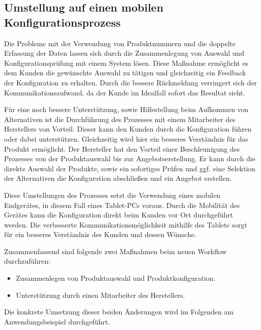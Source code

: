 \subsection{Umstellung auf einen mobilen Konfigurationsprozess}\label{mobileConfiguration}
Die Probleme mit der Verwendung von Produktnummern und die doppelte Erfassung der Daten lassen sich durch die Zusammenlegung von Auswahl und Konfigurationsprüfung mit einem System lösen. Diese Maßnahme ermöglicht es dem Kunden die gewünschte Auswahl zu tätigen und gleichzeitig ein Feedback der Konfiguration zu erhalten. Durch die bessere Rückmeldung verringert sich der Kommunikationsaufwand, da der Kunde im Idealfall sofort das Resultat sieht. \par 
 Für eine noch bessere Unterstützung, sowie Hilfestellung beim Aufkommen von Alternativen ist die Durchführung des Prozesses mit einem Mitarbeiter des Herstellers von Vorteil. Dieser kann den Kunden durch die Konfiguration führen oder dabei unterstützen. Gleichzeitig wird hier ein besseres Verständnis für das Produkt ermöglicht. Der Hersteller hat den Vorteil einer Beschleunigung des Prozesses von der Produktauswahl bis zur Angebotserstellung. Er kann durch die direkte Auswahl der Produkte, sowie ein sofortiges Prüfen und ggf. eine Selektion der Alternativen die Konfiguration abschließen und ein  Angebot erstellen. \par 
 
Diese Umstellungen des Prozesses setzt die Verwendung eines mobilen Endgerätes, in diesem Fall eines Tablet-PCs voraus. Durch die Mobilität des Gerätes kann die Konfiguration direkt beim Kunden vor Ort durchgeführt werden. Die verbesserte Kommunikationsmöglichkeit mithilfe des Tablets sorgt für ein besseres Verständnis des Kunden und dessen Wünsche. 


Zusammenfassend sind folgende zwei Maßnahmen beim neuen Workflow durchzuführen: \par

\begin{itemize}
        \item Zusammenlegen von Produktauswahl und Produktkonfiguration. 
        \item Unterstützung durch einen Mitarbeiter des Herstellers.
\end{itemize}
Die konkrete Umsetzung dieser beiden Änderungen wird im Folgenden am Anwendungsbeispiel durchgeführt. \par


